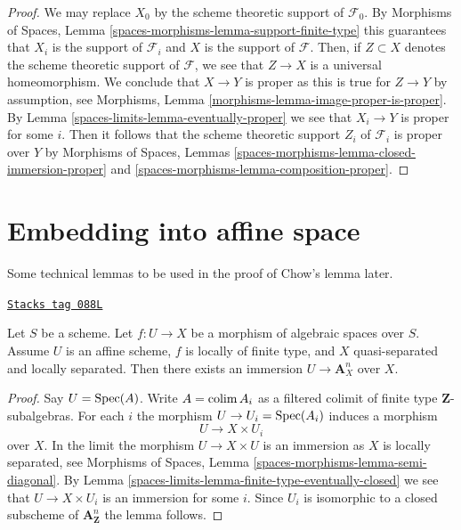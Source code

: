 \begin{proof}
We may replace $X_0$ by the scheme theoretic support of $\mathcal{F}_0$.
By Morphisms of Spaces, Lemma \ref{spaces-morphisms-lemma-support-finite-type}
this guarantees that $X_i$ is the support of $\mathcal{F}_i$ and $X$ is the
support of $\mathcal{F}$. Then, if $Z \subset X$ denotes the scheme
theoretic support of $\mathcal{F}$, we see that $Z \to X$ is a universal
homeomorphism. We conclude that $X \to Y$ is proper as this is true for
$Z \to Y$ by assumption, see
Morphisms, Lemma \ref{morphisms-lemma-image-proper-is-proper}.
By Lemma \ref{spaces-limits-lemma-eventually-proper} we see that $X_i \to Y$ is proper
for some $i$. Then it follows that the scheme theoretic support $Z_i$ of
$\mathcal{F}_i$ is proper over $Y$ by
Morphisms of Spaces, Lemmas
\ref{spaces-morphisms-lemma-closed-immersion-proper} and
\ref{spaces-morphisms-lemma-composition-proper}.
\end{proof}

\section{Embedding into affine space}
\label{spaces-limits-section-embedding}
Some technical lemmas to be used in the proof of Chow's lemma later.

\begin{lemma}
\label{spaces-limits-lemma-embedding-into-affine-over-ls-qs}
\href{https://stacks.math.columbia.edu/tag/088L}{\texttt{Stacks tag 088L}}

Let $S$ be a scheme. Let $f : U \to X$ be a morphism of algebraic
spaces over $S$. Assume $U$ is an affine scheme, $f$ is locally of
finite type, and $X$ quasi-separated and locally separated.
Then there exists an immersion $U \to \mathbf{A}^n_X$ over $X$.
\end{lemma}

\begin{proof}
Say $U = \operatorname{Spec}(A)$. Write $A = \operatorname{colim} A_i$ as a filtered colimit
of finite type $\mathbf{Z}$-subalgebras. For each $i$ the morphism
$U \to U_i = \operatorname{Spec}(A_i)$ induces a morphism
$$
U \longrightarrow X \times U_i
$$
over $X$. In the limit the morphism $U \to X \times U$ is an immersion
as $X$ is locally separated, see
Morphisms of Spaces, Lemma
\ref{spaces-morphisms-lemma-semi-diagonal}.
By Lemma \ref{spaces-limits-lemma-finite-type-eventually-closed}
we see that $U \to X \times U_i$ is an immersion for some $i$.
Since $U_i$ is isomorphic to a closed subscheme of
$\mathbf{A}^n_{\mathbf{Z}}$ the lemma follows.
\end{proof}

